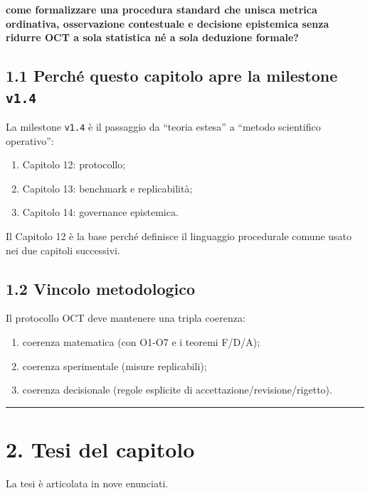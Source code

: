 \textbf{come formalizzare una procedura standard che unisca metrica ordinativa, osservazione contestuale e decisione epistemica senza ridurre OCT a sola statistica né a sola deduzione formale?}

\subsection{\texorpdfstring{1.1 Perché questo capitolo apre la milestone \texttt{v1.4}}{1.1 Perché questo capitolo apre la milestone v1.4}}

La milestone \texttt{v1.4} è il passaggio da ``teoria estesa'' a ``metodo scientifico operativo'':

\begin{enumerate}
\def\labelenumi{\arabic{enumi}.}
\tightlist
\item
  Capitolo 12: protocollo;
\item
  Capitolo 13: benchmark e replicabilità;
\item
  Capitolo 14: governance epistemica.
\end{enumerate}

Il Capitolo 12 è la base perché definisce il linguaggio procedurale comune usato nei due capitoli successivi.

\subsection{1.2 Vincolo metodologico}

Il protocollo OCT deve mantenere una tripla coerenza:

\begin{enumerate}
\def\labelenumi{\arabic{enumi}.}
\tightlist
\item
  coerenza matematica (con O1-O7 e i teoremi F/D/A);
\item
  coerenza sperimentale (misure replicabili);
\item
  coerenza decisionale (regole esplicite di accettazione/revisione/rigetto).
\end{enumerate}

\begin{center}\rule{0.5\linewidth}{0.5pt}\end{center}

\section{2. Tesi del capitolo}

La tesi è articolata in nove enunciati.

